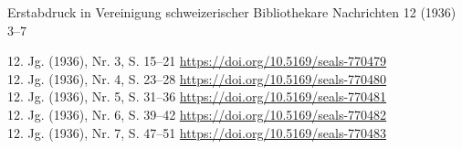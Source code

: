 Erstabdruck in Vereinigung schweizerischer Bibliothekare Nachrichten 12
(1936) 3--7

12. Jg. (1936), Nr. 3, S. 15--21
\href{https://doi.org/10.5169/seals-770479}{https://doi.org/10.5169/seals-770479}\\
12. Jg. (1936), Nr. 4, S. 23--28
\href{https://doi.org/10.5169/seals-770480}{https://doi.org/10.5169/seals-770480}\\
12. Jg. (1936), Nr. 5, S. 31--36
\href{https://doi.org/10.5169/seals-770480}{https://doi.org/10.5169/seals-770481}\\
12. Jg. (1936), Nr. 6, S. 39--42
\href{https://doi.org/10.5169/seals-770482}{https://doi.org/10.5169/seals-770482}\\
12. Jg. (1936), Nr. 7, S. 47--51
\href{https://doi.org/10.5169/seals-770483}{https://doi.org/10.5169/seals-770483}
